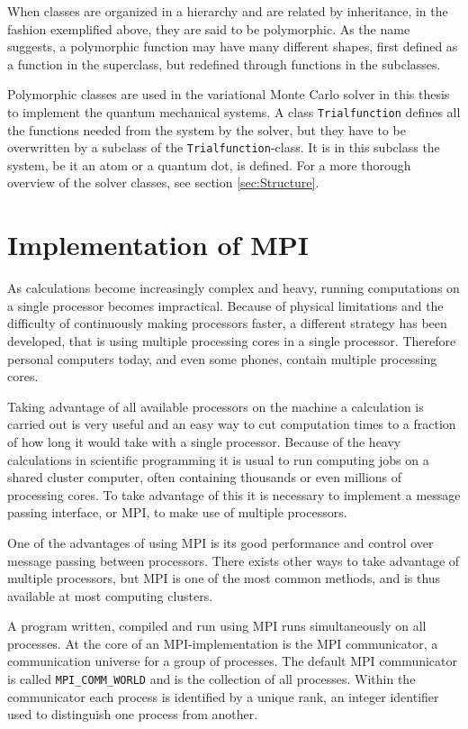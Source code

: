 		When classes are organized in a hierarchy and are related by inheritance, in the fashion exemplified above, they are said to be polymorphic. As the name suggests, a polymorphic function may have many different shapes, first defined as a function in the superclass, but redefined through functions in the subclasses.

		Polymorphic classes are used in the variational Monte Carlo solver in this thesis to implement the quantum mechanical systems. A class {\tt Trialfunction} defines all the functions needed from the system by the solver, but they have to be overwritten by a subclass of the {\tt Trialfunction}-class. It is in this subclass the system, be it an atom or a quantum dot, is defined. For a more thorough overview of the solver classes, see section \ref{sec:Structure}.

\section{Implementation of MPI}
		
		As calculations become increasingly complex and heavy, running computations on a single processor becomes impractical. Because of physical limitations and the difficulty of continuously making processors faster, a different strategy has been developed, that is using multiple processing cores in a single processor. Therefore personal computers today, and even some phones, contain multiple processing cores. 

		Taking advantage of all available processors on the machine a calculation is carried out is very useful and an easy way to cut computation times to a fraction of how long it would take with a single processor. Because of the heavy calculations in scientific programming it is usual to run computing jobs on a shared cluster computer, often containing thousands or even millions of processing cores. To take advantage of this it is necessary to implement a message passing interface, or MPI, to make use of multiple processors. 

		One of the advantages of using MPI is its good performance and control over message passing between processors. There exists other ways to take advantage of multiple processors, but MPI is one of the most common methods, and is thus available at most computing clusters.

		A program written, compiled and run using MPI runs simultaneously on all processes. At the core of an MPI-implementation is the MPI communicator, a communication universe for a group of processes. The default MPI communicator is called {\tt MPI\_COMM\_WORLD} and is the collection of all processes. Within the communicator each process is identified by a unique rank, an integer identifier used to distinguish one process from another.

